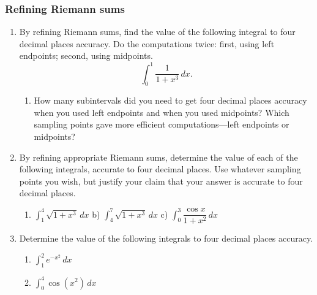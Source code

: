 \subsubsection{Refining Riemann sums}
\label{subsubsec:refining-riemann-sums}




\begin{enumerate}
\item By refining Riemann sums, find the value of the following
integral to four decimal places accuracy.  Do the computations twice:
first, using left endpoints; second, using midpoints.
	\[
\int_0^1 \dfrac{1}{1 + x^3} \, dx.
\]


  \begin{enumerate}
  \item How many subintervals did you need to get four decimal places
accuracy when you used left endpoints and when you used midpoints?
Which sampling points gave more efficient computations---left
endpoints or midpoints?



\end{enumerate}
\item By refining appropriate Riemann sums, determine the value of each
of the following integrals, accurate to four decimal places.  Use
whatever sampling points you wish, but justify your claim that your
answer is accurate to four decimal places.

  \begin{enumerate}
  \item ${\displaystyle \int_1^4 \sqrt{1 + x^3} \, dx}$
\hfill b) ${\displaystyle \int_4^7 \sqrt{1 + x^3} \, dx}$
\hfill c) ${\displaystyle 
	\int_0^3 \dfrac{\cos{x}}{1+x^2}\, dx}$ \hfill \mbox{}




\end{enumerate}
\item Determine the value of the following integrals to four decimal
places accuracy.



  \begin{enumerate}
  \item ${\displaystyle \int_1^2 e^{-x^2}\, dx}$


  \item ${\displaystyle \int_0^4 \cos(x^2) \, dx}$


\end{enumerate}
\end{enumerate}
